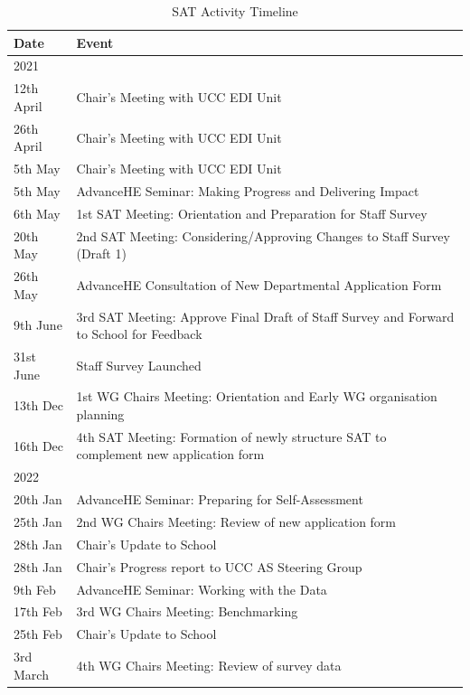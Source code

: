 \begin{table}[!t]

\colorbox{SwanOrange!10}{
      \begin{minipage}{14.3cm}
      
\footnotesize       
\caption{SAT Activity Timeline}
\label{tab:activitytimeline}


\begin{tabular}{p{2cm} 
                p{12.3cm}}
\toprule

Date & Event \\
\midrule
2021 \\
\midrule 
12th April	& Chair’s Meeting with UCC EDI Unit\\
26th April	& Chair’s Meeting with UCC EDI Unit\\
5th May	& Chair’s Meeting with UCC EDI Unit\\
5th May	& AdvanceHE Seminar: Making Progress and Delivering Impact\\
6th May	& 1st SAT Meeting: Orientation and Preparation for Staff Survey\\
20th May & 2nd SAT Meeting: Considering/Approving Changes to Staff Survey (Draft 1)\\
26th May &	AdvanceHE Consultation of New Departmental Application Form\\
9th June &	3rd SAT Meeting: Approve Final Draft of Staff Survey and Forward to School for Feedback\\
31st June &	Staff Survey Launched\\
13th Dec &	1st WG Chairs Meeting: Orientation and Early WG organisation planning\\
16th Dec &	4th SAT Meeting: Formation of newly structure SAT to complement new application form\\
\midrule 
2022	\\
\midrule 
20th Jan &	AdvanceHE Seminar: Preparing for Self-Assessment\\
25th Jan &	2nd WG Chairs Meeting: Review of new application form\\
28th Jan &	Chair’s Update to School\\
28th Jan &	Chair’s Progress report to UCC AS Steering Group\\
9th Feb	& AdvanceHE Seminar: Working with the Data\\
17th Feb &	3rd  WG Chairs Meeting: Benchmarking\\
25th Feb &	Chair’s Update to School\\
3rd March &	4th  WG Chairs Meeting: Review of survey data\\

\end{tabular}
\end{minipage}}
\end{table}
